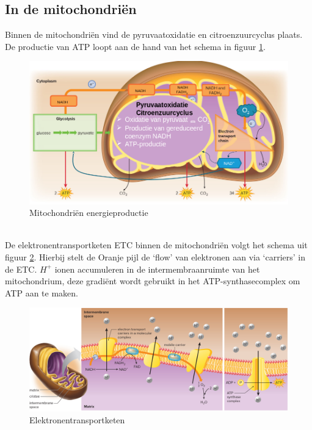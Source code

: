 \documentclass[a4paper,kul]{kulakarticle} %
\begin{document}
\subsection{In de mitochondriën}
Binnen de mitochondriën vind de pyruvaatoxidatie en citroenzuurcyclus plaats. De productie van ATP loopt aan de hand van het schema in figuur \ref{fig:energieproductiemito}.
\begin{figure}[h]
	\centering
	\includegraphics[width=0.7\linewidth]{EnergieProductieMito}
	\caption[Mitochondriën energieproductie]{Mitochondriën energieproductie}
	\label{fig:energieproductiemito}
\end{figure}\\
De elektronentransportketen ETC binnen de mitochondriën volgt het schema uit figuur \ref{fig:elektrontransport}. Hierbij stelt de Oranje pijl de `flow' van elektronen aan via `carriers' in de ETC. $H^+$ ionen accumuleren in de intermembraanruimte van het mitochondrium, deze gradiënt wordt gebruikt in het ATP-synthasecomplex om ATP aan te maken.
\begin{figure}[h]
	\centering
	\includegraphics[width=0.7\linewidth]{ElektronTransport}
	\caption[ETC]{Elektronentransportketen}
	\label{fig:elektrontransport}
\end{figure}
\newpage
\end{document}
